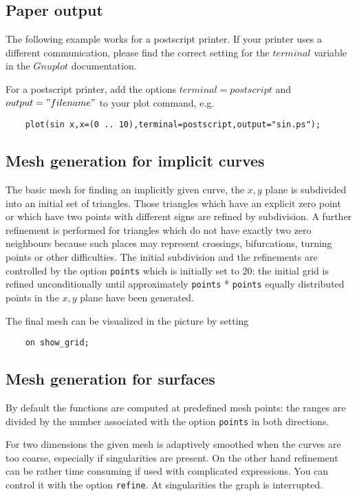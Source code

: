 \subsection{Paper output}
The following example works for a  postscript printer.
If your printer uses a different communication, please find
the correct setting for the $terminal$ variable in the $Gnuplot$
documentation.

For a postscript printer, add the options $terminal=postscript$
and $output="filename"$
to your plot command, e.g.
\begin{verbatim}
    plot(sin x,x=(0 .. 10),terminal=postscript,output="sin.ps");
\end{verbatim}

\subsection{Mesh generation for implicit curves}

The basic mesh for finding an implicitly given curve,
the $x,y$ plane is subdivided into an initial set of triangles.
Those triangles which have an explicit zero point or which have
two points with different signs are refined by subdivision.
A further refinement is performed for triangles which do not have
exactly two zero neighbours because such places may represent crossings,
bifurcations, turning points or other difficulties.
The initial subdivision and the refinements are controlled by
the option \verb+points+ which is initially set to 20:
the initial grid is refined unconditionally until approximately
 \verb+points+ *  \verb+points+ equally distributed
points in the $x,y$ plane have been generated.

The final mesh can be visualized in the picture by setting
\begin{verbatim}
    on show_grid;
\end{verbatim}

\subsection{Mesh generation for surfaces}

By default the functions are computed  at predefined
mesh points: the ranges are divided by the number
associated with the option \verb$points$ in both 
directions.

For two dimensions the given mesh is adaptively
smoothed when the curves are too coarse, especially 
if singularities are present. On the other hand
refinement can be rather time consuming if used with
complicated expressions. You can control it with the option 
\verb+refine+. At singularities the graph is
interrupted.

